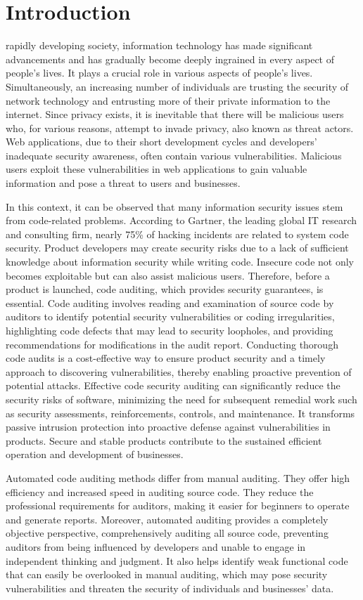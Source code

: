 \documentclass[journal]{IEEEtran}
\begin{document}
\section{Introduction}
 rapidly developing society, information technology has made significant advancements and has gradually become deeply ingrained in every aspect of people's lives. It plays a crucial role in various aspects of people's lives. Simultaneously, an increasing number of individuals are trusting the security of network technology and entrusting more of their private information to the internet. Since privacy exists, it is inevitable that there will be malicious users who, for various reasons, attempt to invade privacy, also known as threat actors. Web applications, due to their short development cycles and developers' inadequate security awareness, often contain various vulnerabilities. Malicious users exploit these vulnerabilities in web applications to gain valuable information and pose a threat to users and businesses.

In this context, it can be observed that many information security issues stem from code-related problems. According to Gartner, the leading global IT research and consulting firm, nearly 75\% of hacking incidents are related to system code security. Product developers may create security risks due to a lack of sufficient knowledge about information security while writing code. Insecure code not only becomes exploitable but can also assist malicious users. Therefore, before a product is launched, code auditing, which provides security guarantees, is essential. Code auditing involves reading and examination of source code by auditors to identify potential security vulnerabilities or coding irregularities, highlighting code defects that may lead to security loopholes, and providing recommendations for modifications in the audit report. Conducting thorough code audits is a cost-effective way to ensure product security and a timely approach to discovering vulnerabilities, thereby enabling proactive prevention of potential attacks. Effective code security auditing can significantly reduce the security risks of software, minimizing the need for subsequent remedial work such as security assessments, reinforcements, controls, and maintenance. It transforms passive intrusion protection into proactive defense against vulnerabilities in products. Secure and stable products contribute to the sustained efficient operation and development of businesses.

Automated code auditing methods differ from manual auditing. They offer high efficiency and increased speed in auditing source code. They reduce the professional requirements for auditors, making it easier for beginners to operate and generate reports. Moreover, automated auditing provides a completely objective perspective, comprehensively auditing all source code, preventing auditors from being influenced by developers and unable to engage in independent thinking and judgment. It also helps identify weak functional code that can easily be overlooked in manual auditing, which may pose security vulnerabilities and threaten the security of individuals and businesses' data.
\end{document}
